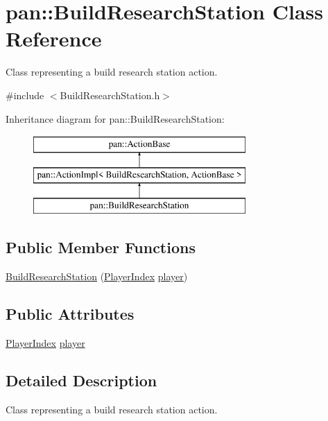 \hypertarget{classpan_1_1_build_research_station}{}\section{pan\+:\+:Build\+Research\+Station Class Reference}
\label{classpan_1_1_build_research_station}


Class representing a build research station action.  




{\ttfamily \#include $<$Build\+Research\+Station.\+h$>$}

Inheritance diagram for pan\+:\+:Build\+Research\+Station\+:\begin{figure}[H]
\begin{center}
\leavevmode
\includegraphics[height=3.000000cm]{classpan_1_1_build_research_station}
\end{center}
\end{figure}
\subsection*{Public Member Functions}
\begin{DoxyCompactItemize}
\item 
\hyperlink{classpan_1_1_build_research_station_a3cd2f5cb3c914c9afa042cd762f46028}{Build\+Research\+Station} (\hyperlink{namespacepan_a0cdabf874fbf1bb3a1f0152d108c2909}{Player\+Index} \hyperlink{classpan_1_1_build_research_station_aa3d64958ccabccec40f25efa85b078a5}{player})
\end{DoxyCompactItemize}
\subsection*{Public Attributes}
\begin{DoxyCompactItemize}
\item 
\hyperlink{namespacepan_a0cdabf874fbf1bb3a1f0152d108c2909}{Player\+Index} \hyperlink{classpan_1_1_build_research_station_aa3d64958ccabccec40f25efa85b078a5}{player}
\end{DoxyCompactItemize}


\subsection{Detailed Description}
Class representing a build research station action. 

